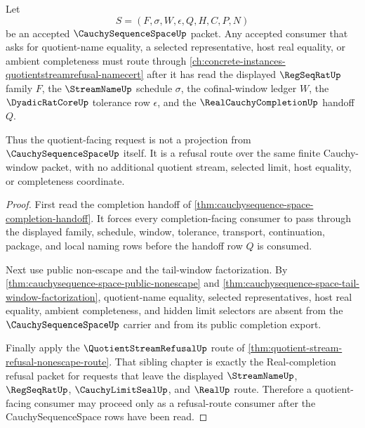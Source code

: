 \begin{theorem}
\label{thm:cauchysequence-space-quotient-refusal-route}
Let
$$
S=(F,\sigma,W,\epsilon,Q,H,C,P,N)
$$
be an accepted $\CauchySequenceSpaceUp$ packet. Any accepted consumer that asks for quotient-name equality, a selected representative, host real equality, or ambient completeness must route through \autoref{ch:concrete-instances-quotientstreamrefusal-namecert} after it has read the displayed $\RegSeqRatUp$ family $F$, the $\StreamNameUp$ schedule $\sigma$, the cofinal-window ledger $W$, the $\DyadicRatCoreUp$ tolerance row $\epsilon$, and the $\RealCauchyCompletionUp$ handoff $Q$.

Thus the quotient-facing request is not a projection from $\CauchySequenceSpaceUp$ itself. It is a refusal route over the same finite Cauchy-window packet, with no additional quotient stream, selected limit, host equality, or completeness coordinate.
\end{theorem}
\begin{proof}
First read the completion handoff of \autoref{thm:cauchysequence-space-completion-handoff}. It forces every completion-facing consumer to pass through the displayed family, schedule, window, tolerance, transport, continuation, package, and local naming rows before the handoff row $Q$ is consumed.

Next use public non-escape and the tail-window factorization. By \autoref{thm:cauchysequence-space-public-nonescape} and \autoref{thm:cauchysequence-space-tail-window-factorization}, quotient-name equality, selected representatives, host real equality, ambient completeness, and hidden limit selectors are absent from the $\CauchySequenceSpaceUp$ carrier and from its public completion export.

Finally apply the $\QuotientStreamRefusalUp$ route of \autoref{thm:quotient-stream-refusal-nonescape-route}. That sibling chapter is exactly the Real-completion refusal packet for requests that leave the displayed $\StreamNameUp$, $\RegSeqRatUp$, $\CauchyLimitSealUp$, and $\RealUp$ route. Therefore a quotient-facing consumer may proceed only as a refusal-route consumer after the CauchySequenceSpace rows have been read.
\end{proof}

